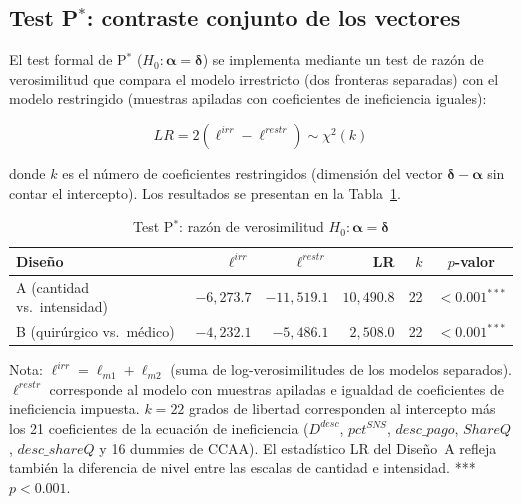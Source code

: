 \documentclass[12pt, a4paper]{article}
\newcommand{\bsym}[1]{\boldsymbol{#1}}
\begin{document}
\subsection{Test P$^*$: contraste conjunto de los vectores}
\label{sec:test_pstar}

El test formal de P$^*$ ($H_0: \bsym{\alpha} =
\bsym{\delta}$) se implementa mediante un test de razón
de verosimilitud que compara el modelo irrestricto (dos
fronteras separadas) con el modelo restringido (muestras
apiladas con coeficientes de ineficiencia iguales):

\begin{equation}
  LR = 2\left(\ell^{irr} - \ell^{restr}\right)
  \sim \chi^2(k)
  \label{eq:lr_test}
\end{equation}

donde $k$ es el número de coeficientes restringidos
(dimensión del vector $\bsym{\delta} - \bsym{\alpha}$
sin contar el intercepto). Los resultados se presentan
en la Tabla~\ref{tab:test_pstar}.

\begin{table}[h!]
\centering
\caption{Test P$^*$: razón de verosimilitud
$H_0: \bsym{\alpha} = \bsym{\delta}$}
\label{tab:test_pstar}
\begin{threeparttable}
\begin{tabular}{lrrrrc}
\toprule
\textbf{Diseño} & $\ell^{irr}$ & $\ell^{restr}$ &
\textbf{LR} & $k$ & \textbf{$p$-valor} \\
\midrule
A (cantidad vs.\ intensidad) &
  $-6{,}273.7$ & $-11{,}519.1$ &
  $10{,}490.8$ & 22 & $<0.001^{***}$ \\
B (quirúrgico vs.\ médico) &
  $-4{,}232.1$ & $-5{,}486.1$ &
  $2{,}508.0$ & 22 & $<0.001^{***}$ \\
\bottomrule
\end{tabular}
\begin{tablenotes}
  \small
  \item Nota: $\ell^{irr} = \ell_{m1} + \ell_{m2}$
    (suma de log-verosimilitudes de los modelos
    separados). $\ell^{restr}$ corresponde al modelo
    con muestras apiladas e igualdad de coeficientes
    de ineficiencia impuesta. $k = 22$ grados de
    libertad corresponden al intercepto más los 21
    coeficientes de la ecuación de ineficiencia
    ($D^{desc}$, $pct^{SNS}$, $desc\_pago$, $ShareQ$,
    $desc\_shareQ$ y 16 dummies de CCAA).
    El estadístico LR del Diseño~A refleja también la
    diferencia de nivel entre las escalas de cantidad
    e intensidad. *** $p<0.001$.
\end{tablenotes}
\end{threeparttable}
\end{table}
\end{document}
